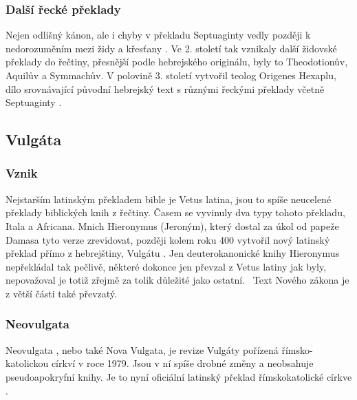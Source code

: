 \documentclass[letterpaper,12pt,oneside]{article}
\begin{document}
\subsubsection{Další řecké překlady}
Nejen odlišný kánon, ale i chyby v překladu Septuaginty  vedly později k nedorozuměním mezi židy  a křesťany . Ve 2. století tak vznikaly další židovské  překlady do řečtiny, přesnější podle hebrejského originálu, byly to Theodotionův, Aquilův a Symmachův. V polovině 3. století vytvořil teolog Origenes Hexaplu, dílo srovnávající původní hebrejský text s různými řeckými překlady včetně Septuaginty  .~\cite[strana 18]{cep}

\subsection{Vulgáta}
\subsubsection{Vznik}
Nejstarším latinským překladem bible je Vetus latina, jsou to spíše neucelené překlady biblických knih z řečtiny. Časem se vyvinuly dva typy tohoto překladu, Itala a Africana. Mnich Hieronymus (Jeroným), který dostal za úkol od papeže Damasa tyto verze zrevidovat, později kolem roku 400 vytvořil nový latinský překlad přímo z hebrejštiny, Vulgátu . Jen deuterokanonické knihy Hieronymus nepřekládal tak pečlivě, některé dokonce jen převzal z Vetus latiny jak byly, nepovažoval je totiž zřejmě za tolik důležité jako ostatní.~\cite[strana 18-19]{cep}  Text Nového zákona je z větší části také převzatý.

\subsubsection{Neovulgata}
Neovulgata , nebo také Nova Vulgata, je revize Vulgáty pořízená římsko-katolickou církví  v roce 1979. Jsou v ní spíše drobné změny a neobsahuje pseudoapokryfní knihy. Je to nyní oficiální latinský překlad římskokatolické církve .~\cite[strana 19]{cep}
\end{document}
